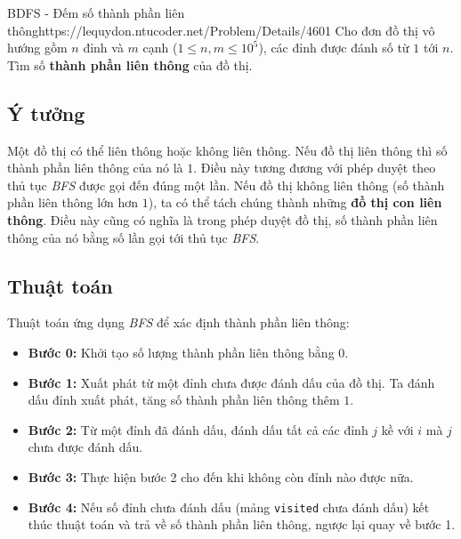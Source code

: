 \begin{baitap}{BDFS - Đếm số thành phần liên thông}{https://lequydon.ntucoder.net/Problem/Details/4601}
Cho đơn đồ thị vô hướng gồm $n$ đỉnh và $m$ cạnh ($1 \leq n, m \leq 10^5$), các đỉnh được đánh số từ $1$ tới $n$. Tìm số \textbf{thành phần liên thông} của đồ thị.

\subsection{Ý tưởng}

Một đồ thị có thể liên thông hoặc không liên thông. Nếu đồ thị liên thông thì số thành phần liên thông của nó là $1$. Điều này tương đương với phép duyệt theo thủ tục \textit{BFS} được gọi đến đúng một lần. Nếu đồ thị không liên thông (số thành phần liên thông lớn hơn $1$), ta có thể tách chúng thành những \textbf{đồ thị con liên thông}. Điều này cũng có nghĩa là trong phép duyệt đồ thị, số thành phần liên thông của nó bằng số lần gọi tới thủ tục \textit{BFS}.

\subsection{Thuật toán}

Thuật toán ứng dụng \textit{BFS} để xác định thành phần liên thông:

\begin{itemize}
    \item \textbf{Bước 0:} Khởi tạo số lượng thành phần liên thông bằng $0$.
    \item \textbf{Bước 1:} Xuất phát từ một đỉnh chưa được đánh dấu của đồ thị. Ta đánh dấu đỉnh xuất phát, tăng số thành phần liên thông thêm $1$.
    \item \textbf{Bước 2:} Từ một đỉnh đã đánh dấu, đánh dấu tất cả các đỉnh $j$ kề với $i$ mà $j$ chưa được đánh dấu.
    \item \textbf{Bước 3:} Thực hiện bước 2 cho đến khi không còn đỉnh nào được nữa.
    \item \textbf{Bước 4:} Nếu số đỉnh chưa đánh dấu (mảng \texttt{visited} chưa đánh dấu) kết thúc thuật toán và trả về số thành phần liên thông, ngược lại quay về bước 1.
\end{itemize}
\end{baitap}

